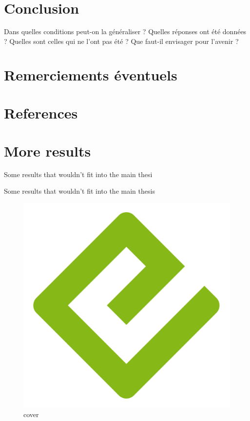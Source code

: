 \documentclass[
  a4paper,
]{scrbook}
\newlength{\cslhangindent}
\newlength{\cslentryspacingunit} %
\newenvironment{CSLReferences}[2] %
 {%
  \setlength{\parindent}{0pt}
  \ifodd #1
  \let\oldpar\par
  \def\par{\hangindent=\cslhangindent\oldpar}
  \fi
  \setlength{\parskip}{#2\cslentryspacingunit}
 }%
 {}
\begin{document}
\hypertarget{conclusion}{%
\chapter{Conclusion}\label{conclusion}}

Dans quelles conditions peut-on la généraliser ? Quelles réponses ont
été données ? Quelles sont celles qui ne l'ont pas été ? Que faut-il
envisager pour l'avenir ?

\hypertarget{remerciements-uxe9ventuels}{%
\chapter{Remerciements éventuels}\label{remerciements-uxe9ventuels}}

\hypertarget{references}{%
\chapter*{References}\label{references}}

\hypertarget{refs}{}
\begin{CSLReferences}{0}{0}
\end{CSLReferences}

\appendix
{}

\hypertarget{sec-more-results}{%
\chapter{More results}\label{sec-more-results}}

Some results that wouldn't fit into the main thesi

Some results that wouldn't fit into the main thesis

\begin{figure}

{\centering \includegraphics{./cover.png}

}

\caption{cover}

\end{figure}


\backmatter
\end{document}
